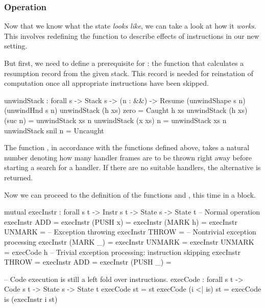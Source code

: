 \subsubsection{Operation}

Now that we know what the state \emph{looks like}, we can take a look at how it \emph{works}.
This involves redefining the function  to describe effects of instructions
in our new setting.

But first, we need to define a prerequisite for : the function
 that calculates a resumption record from the given stack. This record
is needed for reinstation of computation once all appropriate instructions have been skipped.

\begin{code}
  unwindStack : forall {s} -> Stack s -> (n : \bN&\!&)
    -> Resume (unwindShape s n) (unwindHnd s n)
  unwindStack (h \sconsh xs) zero = Caught h xs
  unwindStack (h \sconsh xs) (suc n) = unwindStack xs n
  unwindStack (x \scons xs) n = unwindStack xs n
  unwindStack snil n = Uncaught
\end{code}

\noindent The function , in accordance with the functions
defined above, takes a natural number  denoting how many handler
frames are to be thrown right away before starting a search for a handler.  If
there are no suitable handlers, the alternative  is returned.

Now we can proceed to the definition of the functions  and
, this time in a  block.

\begin{codei}
  mutual
    execInstr : forall {s t} -> Instr s t -> State s -> State t
  	-- Normal operation
    execInstr ADD 				= \tick[ (x + y) \scons st ]
    execInstr (PUSH x)		\tick[ st ] 		= \tick[ x \scons st ]
    execInstr (MARK h)		\tick[ st ] 		= \tick[ h \sconsh st ]
    execInstr UNMARK			= \tick[ x \scons st ]
    -- Exception throwing  
    execInstr THROW			\tick[ st ] =  
    -- Nontrivial exception processing
    execInstr (MARK _)		\x[ n	 ,	r	] = \x[ suc n, r ]
    execInstr UNMARK		\x[ suc n ,	r	] = \x[ n	, r ]
    execInstr UNMARK		 = execCode h \tick[ st ]
    -- Trivial exception processing: instruction skipping
    execInstr THROW			\x[ n , r ] = \x[ n , r ]
    execInstr ADD			\x[ n , r ] = \x[ n , r ]
    execInstr (PUSH _)		\x[ n , r ] = \x[ n , r ]
\end{codei}
\begin{code}
    -- Code execution is still a left fold over instructions.
    execCode : forall {s t} -> Code s t -> State s -> State t
    execCode \nil st = st
    execCode (i <| is) st = execCode is (execInstr i st)
\end{code}


